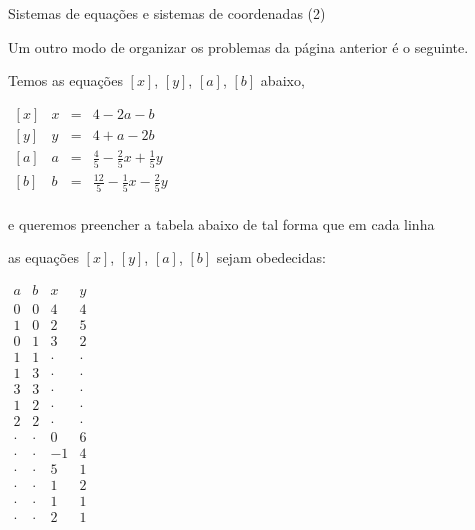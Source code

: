 \documentclass[oneside]{book}
\begin{document}
\newpage



%


{\setlength{\parindent}{0em}

 {Sistemas de equações e sistemas de coordenadas (2)}

Um outro modo de organizar os problemas da página anterior é o
seguinte.

Temos as equações $[x]$, $[y]$, $[a]$, $[b]$ abaixo,

\ssk

$\begin{array}{crcl}
   {}[x] & x &=& 4-2a-b \\
   {}[y] & y &=& 4+a-2b \\
   {}[a] & a &=& \frac45 -\frac25 x + \frac15 y  \\
   {}[b] & b &=& \frac{12}5 -\frac15 x - \frac25 y \\
 \end{array}
$

\ssk

e queremos preencher a tabela abaixo de tal forma que em cada linha

as equações $[x]$, $[y]$, $[a]$, $[b]$ sejam obedecidas:

$\begin{array}{rrrr}
   a & b & x & y \\\hline
 0 & 0 & 4 & 4 \\
 1 & 0 & 2 & 5 \\
 0 & 1 & 3 & 2 \\
 1 & 1 & · & · \\
 1 & 3 & · & · \\
 3 & 3 & · & · \\
 1 & 2 & · & · \\
 2 & 2 & · & · \\
 · & · & 0 & 6 \\
 · & · &-1 & 4 \\
 · & · & 5 & 1 \\
 · & · & 1 & 2 \\
 · & · & 1 & 1 \\
 · & · & 2 & 1 \\
 \end{array}
$

}
\end{document}

